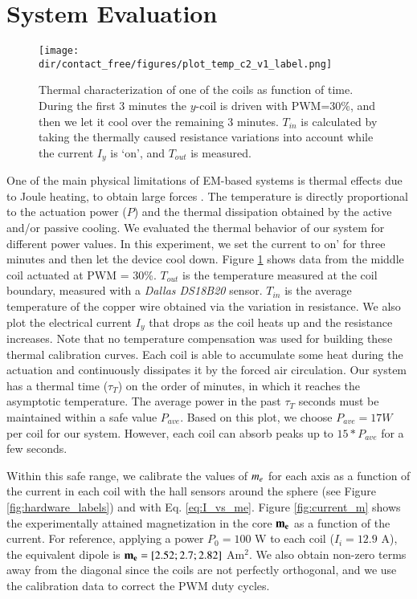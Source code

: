 
\section{System Evaluation}

\begin{figure}[!t]
    \centering
    \medskip
    \texttt{[image: \\dir/contact\_free/figures/plot\_temp\_c2\_v1\_label.png]}
    \caption{Thermal characterization of one of the coils as function of time. During the first 3 minutes the $y$-coil is driven with PWM=30\%, and then we let it cool over the remaining 3 minutes. $T_{in}$ is calculated by taking the thermally caused resistance variations into account while the current $I_y$ is `on', and $T_{out}$ is measured.}
    \label{fig:temp}
\end{figure}{}

One of the main physical limitations of EM-based systems is thermal effects due to Joule heating, to obtain large forces \cite{esmailie2017thermal}. The temperature is directly proportional to the actuation power ($P$) and the thermal dissipation obtained by the active and/or passive cooling. We evaluated the thermal behavior of our system for different power values. In this experiment, we set the current to on' for three minutes and then let the device cool down. Figure \ref{fig:temp} shows data from the middle coil actuated at PWM = 30\%. $T_{out}$ is the temperature measured at the coil boundary, measured with a \emph{Dallas DS18B20} sensor. $T_{in}$ is the average temperature of the copper wire obtained via the variation in resistance. We also plot the electrical current $I_y$ that drops as the coil heats up and the resistance increases. Note that no temperature compensation was used for building these thermal calibration curves. Each coil is able to accumulate some heat during the actuation and continuously dissipates it by the forced air circulation. Our system has a thermal time ($\tau_T$) on the order of minutes, in which it reaches the asymptotic temperature. The average power in the past $\tau_T$ seconds must be maintained within a safe value $P_{ave}$. Based on this plot, we choose $P_{ave} = 17 W$ per coil for our system. However, each coil can absorb peaks up to $15*P_{ave}$ for a few seconds.

Within this safe range, we calibrate the values of $m_{e}$ for each axis as a function of the current in each coil with the hall sensors around the sphere (see Figure \ref{fig:hardware_labels}) and with Eq. \ref{eq:I_vs_me}. Figure \ref{fig:current_m} shows the experimentally attained magnetization in the core $\mathbf{m_{e}}$ as a function of the current. For reference, applying a power $P_0 = 100$ W to each coil ($I_i = 12.9$ A), the equivalent dipole is $\mathbf{m_{e}} = [2.52; 2.7; 2.82]$ Am$^2$. We also obtain non-zero terms away from the diagonal since the coils are not perfectly orthogonal, and we use the calibration data to correct the PWM duty cycles.

